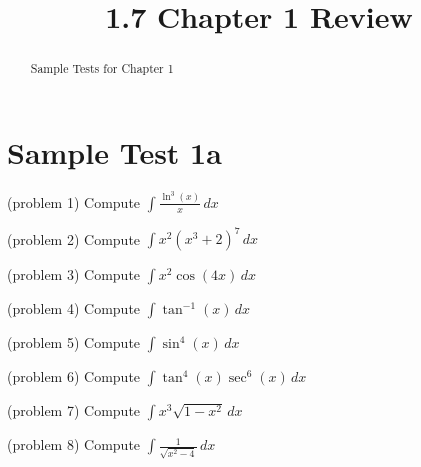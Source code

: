 \documentclass[handout]{ximera}
\title{1.7 Chapter 1 Review}
\begin{document}
\begin{abstract}
Sample Tests for Chapter 1
\end{abstract}

\maketitle

\section{Sample Test 1a}

\begin{problem}(problem 1)
Compute $\displaystyle \int \frac{\ln^3(x)}{x} \, dx$

\end{problem}

\begin{problem}(problem 2)
Compute $\displaystyle \int x^2(x^3 + 2)^7 \, dx$

\end{problem}

\begin{problem}(problem 3)
Compute $\displaystyle \int x^2\cos(4x) \, dx$

\end{problem}


\begin{problem}(problem 4)
Compute $\displaystyle \int \tan^{-1}(x) \, dx$

\end{problem}

\begin{problem}(problem 5)
Compute $\displaystyle \int \sin^4(x) \, dx$

\end{problem}

\begin{problem}(problem 6)
Compute $\displaystyle \int \tan^4(x) \sec^6(x) \, dx$

\end{problem}

\begin{problem}(problem 7)
Compute $\displaystyle \int x^3 \sqrt{1-x^2} \, dx$

\end{problem}

\begin{problem}(problem 8)
Compute $\displaystyle \int \frac{1}{ \sqrt{x^2 - 4}} \, dx$

\end{problem}
\end{document}

